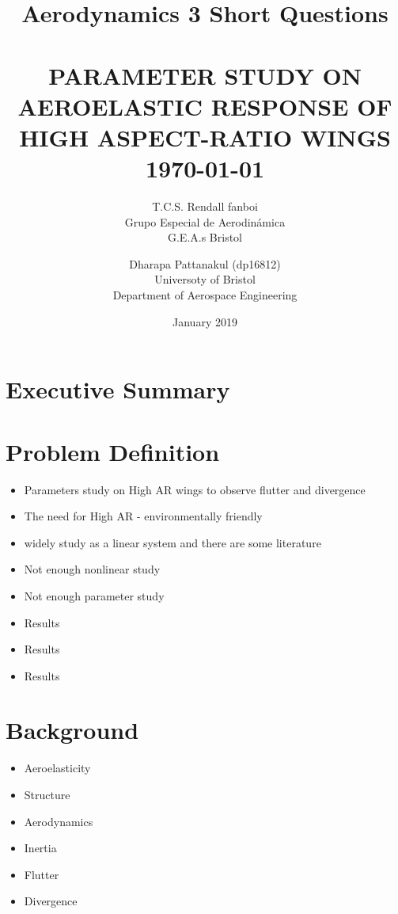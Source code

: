 \documentclass{article}
\title{Aerodynamics 3 Short Questions}
\date{January 2019}
\author{T.C.S. Rendall fanboi \Group \\ Grupo Especial de Aerodinámica \\ G.E.A.s Bristol}
\begin{document}
{\selectfont
\title{ \normalsize \textsc{}
		\\ [2.0cm]
		\HRule{0.5pt} \\
		\LARGE \textbf{\uppercase{Parameter Study on Aeroelastic Response of  High Aspect-Ratio Wings}
		\HRule{2pt} \\ [0.5cm]
		\normalsize \today \vspace*{5\baselineskip}}
		}
}

\date{}

\author{
		Dharapa Pattanakul (dp16812) \\ 
		Universoty of Bristol \\
		Department of Aerospace Engineering }

\maketitle
\newpage
\tableofcontents
\newpage
\section{Executive Summary}

\section{Problem Definition}
\begin{itemize}
    \item Parameters study on High AR wings to observe flutter and divergence
    \item The need for High AR - environmentally friendly
    \item widely study as a linear system and there are some literature
    \item Not enough nonlinear study
    \item Not enough parameter study
    \item Results
    \item Results
    \item Results
\end{itemize}

\section{Background}
\begin{itemize}
    \item Aeroelasticity
    \item Structure
    \item Aerodynamics
    \item Inertia
    \item Flutter
    \item Divergence
\end{itemize}
\end{document}
